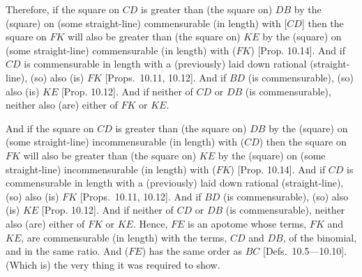 \begin{Parallel}{}{}
{  Therefore, if the square on $CD$ is greater than (the square on) $DB$
  by the (square) on (some straight-line) commensurable  (in length) with [$CD$]  then the square on $FK$ will also be greater than (the square on) $KE$
  by the (square) on (some straight-line) commensurable  (in length) with ($FK$) [Prop. 10.14]. And if $CD$ is commensurable in length with a (previously) laid down rational (straight-line), (so) also (is) $FK$ [Props.~10.11, 10.12]. And if $BD$ (is commensurable), (so) also (is) $KE$ [Prop. 10.12]. And if neither of
  $CD$ or $DB$ (is commensurable), neither also (are) either of $FK$ or $KE$.
  
And if the square on $CD$ is greater than (the square on) $DB$
  by the (square) on (some straight-line) incommensurable  (in length) with ($CD$)  then the square on $FK$ will also be greater than (the square on) $KE$
  by the (square) on (some straight-line) incommensurable  (in length) with ($FK$) [Prop. 10.14]. And if $CD$ is commensurable in length with a (previously) laid down rational (straight-line), (so) also  (is) $FK$ [Props.~10.11, 10.12]. And if $BD$ (is commensurable), (so) also (is) $KE$ [Prop. 10.12]. And if neither of
  $CD$ or $DB$ (is commensurable), neither also (are) either of $FK$ or $KE$.
  Hence, $FE$ is an apotome whose terms, $FK$ and $KE$, are
  commensurable (in length) with the terms, $CD$ and $DB$, of the binomial,
  and in the same ratio. And ($FE$) has the same order as $BC$ [Defs.~10.5---10.10]. 
  (Which is) the very thing it was required to show.}
  \end{Parallel}


\vspace{7pt}{\footnotesize\noindent$^\dag$ Heiberg considers this proposition, and
the succeeding ones, to be  relatively early interpolations into the original
text.}

